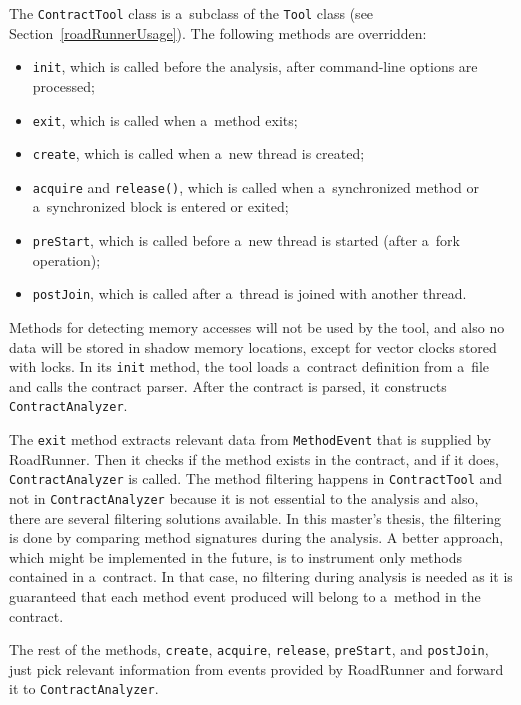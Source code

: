 The \texttt{ContractTool} class is a~subclass of the \texttt{Tool} class (see
Section~\ref{roadRunnerUsage}). The following methods are overridden:
\begin{itemize}
    \item \texttt{init}, which is called before the analysis, after
        command-line options are processed;
    \item \texttt{exit}, which is called when a~method exits;
    \item \texttt{create}, which is called when a~new thread is created;
    \item \texttt{acquire} and \texttt{release()}, which is called when
        a~synchronized method or a~synchronized block is entered or exited;
    \item \texttt{preStart}, which is called before a~new thread is started
        (after a~fork operation);
    \item \texttt{postJoin}, which is called after a~thread is joined with
        another thread.
\end{itemize}
Methods for detecting memory accesses will not be used by the tool, and also no
data will be stored in shadow memory locations, except for vector clocks stored
with locks. In its \texttt{init} method, the tool loads a~contract definition
from a~file and calls the contract parser. After the contract is parsed, it
constructs \texttt{ContractAnalyzer}.

The \texttt{exit} method extracts relevant data from \texttt{MethodEvent} that
is supplied by RoadRunner. Then it checks if the method exists in the contract,
and if it does, \texttt{ContractAnalyzer} is called. The method filtering
happens in \texttt{ContractTool} and not in \texttt{ContractAnalyzer} because it
is not essential to the analysis and also, there are several filtering solutions
available. In this master's thesis, the filtering is done by comparing method
signatures during the analysis. A better approach, which might be implemented in
the future, is to instrument only methods contained in a~contract. In that case,
no filtering during analysis is needed as it is guaranteed that each method
event produced will belong to a~method in the contract.

The rest of the methods, \texttt{create}, \texttt{acquire}, \texttt{release},
\texttt{preStart}, and \texttt{postJoin}, just pick relevant information from
events provided by RoadRunner and forward it to \texttt{ContractAnalyzer}.



